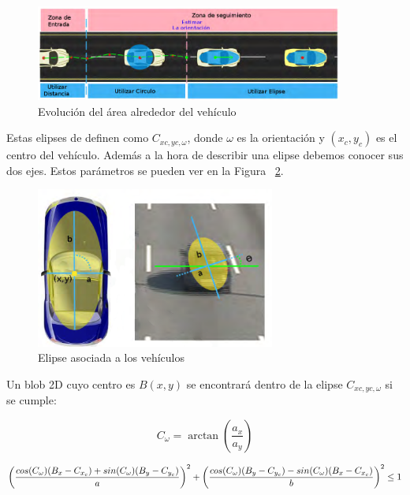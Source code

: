  \begin{figure}[H] 
\begin{center}
	\includegraphics[width=0.9\textwidth]{figures/Diseno_global/areas_vehiculo.png}
   \caption{Evolución del área alrededor del vehículo}
	\label{fig.area_vehiculo}
\end{center}
\end{figure}


Estas elipses de definen como $C_{xc,yc,\omega}$, donde $\omega$ es la orientación y $(x_c, y_c)$ es el centro del vehículo. Además a la hora de describir una elipse debemos conocer sus dos ejes. Estos parámetros se pueden ver en la Figura ~\ref{fig.elipse}.

 \begin{figure}[H] 
\begin{center}
    \includegraphics[width=0.7\textwidth]{figures/Diseno_global/elipse.png}
   \caption{Elipse asociada a los vehículos}
	\label{fig.elipse}
\end{center}
\end{figure}

Un blob 2D cuyo centro es $B(x,y)$ se encontrará dentro de la elipse  $C_{xc,yc,\omega}$ si se cumple:

\begin{equation}\label{ec.blob_elipse}
   C_{\omega} = \arctan(\frac{a_x}{a_y})
\end{equation}

\begin{equation} \scriptsize \label{ec.blob_elipse1}
   \left(\frac{cos(C_\omega)(B_x - C_{x_c}) + sin(C_\omega)(B_y - C_{y_c})}{a} \right)^2 + \left(\frac{cos(C_\omega)(B_y - C_{y_c}) - sin(C_\omega)(B_x - C_{x_c})}{b} \right)^2 \leq 1
\end{equation}


